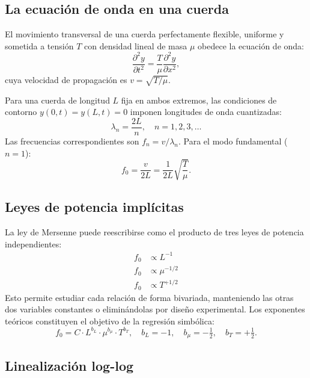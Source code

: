 \documentclass[12pt,a4paper]{article}
\begin{document}
\subsection{La ecuación de onda en una cuerda}

El movimiento transversal de una cuerda perfectamente flexible, uniforme
y sometida a tensión $T$ con densidad lineal de masa $\mu$ obedece la
ecuación de onda:
\begin{equation}
  \frac{\partial^2 y}{\partial t^2} = \frac{T}{\mu}
  \frac{\partial^2 y}{\partial x^2},
\end{equation}
cuya velocidad de propagación es $v = \sqrt{T/\mu}$.

Para una cuerda de longitud $L$ fija en ambos extremos, las condiciones de
contorno $y(0,t)=y(L,t)=0$ imponen longitudes de onda cuantizadas:
\begin{equation}
  \lambda_n = \frac{2L}{n}, \quad n = 1,2,3,\ldots
\end{equation}
Las frecuencias correspondientes son $f_n = v/\lambda_n$. Para el modo
fundamental ($n=1$):
\begin{equation}
  f_0 = \frac{v}{2L} = \frac{1}{2L}\sqrt{\frac{T}{\mu}}.
\end{equation}

\subsection{Leyes de potencia implícitas}

La ley de Mersenne puede reescribirse como el producto de tres leyes de
potencia independientes:
\begin{align}
  f_0 &\propto L^{-1} \label{eq:fL}\\
  f_0 &\propto \mu^{-1/2} \label{eq:fmu}\\
  f_0 &\propto T^{+1/2} \label{eq:fT}
\end{align}
Esto permite estudiar cada relación de forma bivariada, manteniendo las
otras dos variables constantes o eliminándolas por diseño experimental.
Los exponentes teóricos constituyen el objetivo de la regresión simbólica:
\begin{equation}
  f_0 = C \cdot L^{b_L} \cdot \mu^{b_\mu} \cdot T^{b_T},
  \quad
  b_L = -1,\quad b_\mu = -\tfrac{1}{2},\quad b_T = +\tfrac{1}{2}.
\end{equation}

\subsection{Linealización log-log}
\end{document}
